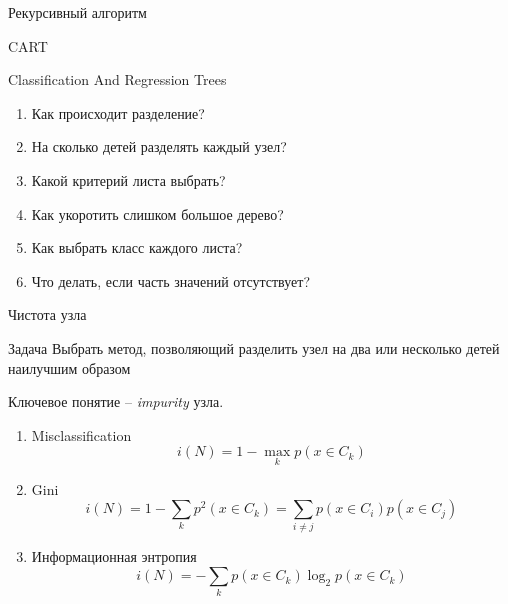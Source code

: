 \documentclass[10pt]{beamer}
\begin{document}

\begin{frame}{Рекурсивный алгоритм}

\dt

\end{frame}

\begin{frame}{CART}

Classification And Regression Trees

\begin{enumerate}
\item Как происходит разделение?
\item На сколько детей разделять каждый узел?
\item Какой критерий листа выбрать?
\item Как укоротить слишком большое дерево?
\item Как выбрать класс каждого листа?
\item Что делать, если часть значений отсутствует?
\end{enumerate}

\end{frame}

\begin{frame}{Чистота узла}

\begin{block}{Задача}
Выбрать метод, позволяющий разделить узел на два или несколько детей наилучшим образом
\end{block}

\vspace{1em}
Ключевое понятие -- {\it impurity} узла.
\begin{enumerate}
\item Misclassification
\[
i(N) = 1 - \max_k p(x \in C_k)
\]
\item Gini
\[
i(N) = 1 - \sum_k p^2(x \in C_k) = \sum_{i \neq j} p(x \in C_i) p(x \in C_j)
\]
\item Информационная энтропия
\[
i(N) =  -\sum_k p(x \in C_k) \log_2 p(x \in C_k)
\]
\end{enumerate}

\end{frame}
\end{document}
